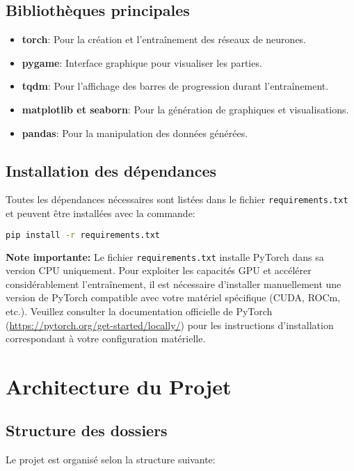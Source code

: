 \documentclass[]{article}
\begin{document}
\subsection{Bibliothèques principales}
\begin{itemize}
  \item \textbf{torch}: Pour la création et l'entraînement des réseaux de neurones.
  \item \textbf{pygame}: Interface graphique pour visualiser les parties.
  \item \textbf{tqdm}: Pour l'affichage des barres de progression durant l'entraînement.
  \item \textbf{matplotlib et seaborn}: Pour la génération de graphiques et visualisations.
  \item \textbf{pandas}: Pour la manipulation des données générées.
\end{itemize}

\subsection{Installation des dépendances}
Toutes les dépendances nécessaires sont listées dans le fichier \texttt{requirements.txt} et peuvent être installées avec la commande:

\begin{lstlisting}[language=bash]
pip install -r requirements.txt
\end{lstlisting}

\textbf{Note importante:} Le fichier \texttt{requirements.txt} installe PyTorch dans sa version CPU uniquement. Pour exploiter les capacités GPU et accélérer considérablement l'entraînement, il est nécessaire d'installer manuellement une version de PyTorch compatible avec votre matériel spécifique (CUDA, ROCm, etc.). Veuillez consulter la documentation officielle de PyTorch (\url{https://pytorch.org/get-started/locally/}) pour les instructions d'installation correspondant à votre configuration matérielle.

\section{Architecture du Projet}

\subsection{Structure des dossiers}
Le projet est organisé selon la structure suivante:
\end{document}
